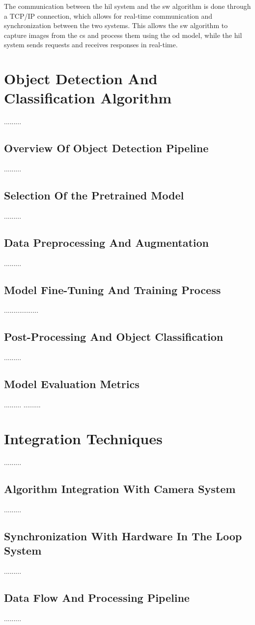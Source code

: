 The communication between the \gls{hil} system and the \gls{sw} algorithm is done through a TCP/IP connection, which allows for real-time communication and synchronization between the two systems. This allows the \gls{sw} algorithm to capture images from the \gls{cs} and process them using the \gls{od} model, while the \gls{hil} system sends requests and receives responses in real-time.


\section{Object Detection And Classification Algorithm}
.........
\subsection{Overview Of Object Detection Pipeline}
.........
\subsection{Selection Of the Pretrained Model}
.........
\subsection{Data Preprocessing And Augmentation}
.........
\subsection{Model Fine-Tuning And Training Process}
..................
\subsection{Post-Processing And Object Classification}
.........
\subsection{Model Evaluation Metrics}
.........
.........
\section{Integration Techniques}
.........
\subsection{Algorithm Integration With Camera System}
.........
\subsection{Synchronization With Hardware In The Loop System}
.........
\subsection{Data Flow And Processing Pipeline}
.........
